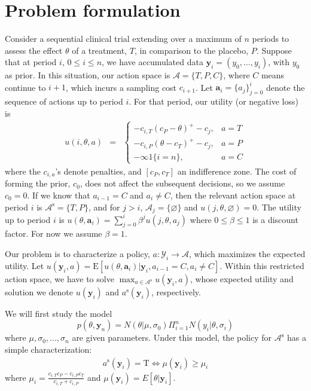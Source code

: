 \documentclass[11pt]{article}
\begin{document}
\section{Problem formulation}
Consider a sequential clinical trial extending over a maximum of $n$
periods to assess the effect $\theta$ of a treatment, $T$, in
comparison to the placebo, $P$. Suppose that at period $i$, $0\leq
i\leq n$, we have accumulated data $\mathbf{y}_i=(y_0,\ldots,y_i)$,
with $y_0$ as prior. In this situation, our action space is
$\mathcal{A}=\{T,P,C\}$, where $C$ means continue to $i+1$, which
incurs a sampling cost $c_{i+1}$. Let
$\mathbf{a}_i=\{a_j\}_{j=0}^{i}$ denote the sequence of actions up
to period $i$. For that period, our utility (or negative loss) is
\begin{eqnarray}\label{util}
u(i,\theta,a)&=&\left\{
\begin{array}{ll}
-c_{i,T}(c_P-\theta)^{+}-c_j,& a=T\\
-c_{i,P}(\theta-c_T)^{+}-c_j,&
a=P\\
-\infty 1\{i=n\},& a=C
\end{array}\right.
\end{eqnarray}where the $c_{i,a}$'s denote penalties, and
$[c_P,c_T]$ an indifference zone. The cost of forming the prior,
$c_0$, does not affect the subsequent decisions, so we assume
$c_0=0$. If we know that $a_{i-1}=C$ and $a_i\neq C$, then the
relevant action space at period $i$ is
$\mathcal{A}^{\mathrm{s}}=\{T,P\}$, and for $j>i$,
$\mathcal{A}_{j}=\{\varnothing\}$ and $u(j,\theta,\varnothing)=0$.
The utility up to period $i$ is
$u(\theta,\mathbf{a}_i)=\sum_{j=0}^{i}\beta^{j}u(j,\theta,a_j)$
where $0\leq\beta\leq 1$ is a discount factor. For now we assume
$\beta=1$.


Our problem is to characterize a policy,
$a:\boldsymbol{\mathcal{Y}}_i\rightarrow\mathcal{A}$, which
maximizes the expected utility. Let
$u(\mathbf{y}_i,a)=\mathrm{E}[u(\theta,\mathbf{a}_{i})|\mathbf{y}_i,a_{i-1}=C,a_{i}\neq
C]$. Within this restricted action space, we have to solve $
\max_{a\in\mathcal{A}^{\mathrm{s}}} u(\mathbf{y}_i,a)$, whose
expected utility and solution we denote $u(\mathbf{y}_i)$ and
$a^{\mathrm{s}}(\mathbf{y}_i)$, respectively.

We will first study the model
\begin{equation}
\label{normal_normal} p(\theta,\mathbf{y}_{n}) =
N(\theta|\mu,\sigma_0)\Pi_{i=1}^{n} N(y_i|\theta,\sigma_i)
\end{equation}where $\mu,\sigma_0,...,\sigma_{n}$ are given
parameters. Under this model, the policy for
$\mathcal{A}^{\mathrm{s}}$ has a simple characterization:
\begin{eqnarray}\label{T_or_P}a^{\mathrm{s}}(\mathbf{y}_i)=\mathrm{T}
\Leftrightarrow \mu(\mathbf{y}_{i})\geq \mu_i\end{eqnarray}where
$\mu_i=\frac{c_{i,T}c_{P}-c_{i,P}c_{T}}{c_{i,T}+c_{i,P}}$ and
$\mu(\mathbf{y}_i)=E[\theta|\mathbf{y}_i]$.
\end{document}
